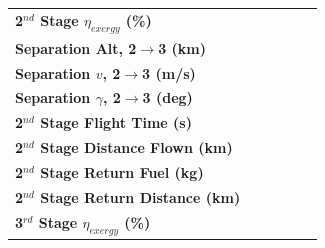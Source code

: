 \begin{table}[ht]
\begin{tabular}{l c c c c c }
		\hline 
		\textbf{2$^{nd}$ Stage $\eta_{exergy}$ (\%)}
		& \textbf{\secondExergyEffheatLimStandard}
		& \textbf{\secondExergyEffheatLimSeventeenHundred}
		& \textbf{\secondExergyEffheatLimSixteenHundred}
		& \textbf{\secondExergyEffheatLimFifteenHundred}
		& \textbf{\secondExergyEffheatLimFourteenHundred}
		\\
		\textbf{Separation Alt, 2$\rightarrow$3 (km)}
		& \secondthirdSeparationAltheatLimStandard
		& \secondthirdSeparationAltheatLimSeventeenHundred
		& \secondthirdSeparationAltheatLimSixteenHundred
		& \secondthirdSeparationAltheatLimFifteenHundred
		& \secondthirdSeparationAltheatLimFourteenHundred
		\\
		\textbf{Separation $v$, 2$\rightarrow$3 (m/s)}
		& \secondthirdSeparationvheatLimStandard
		& \secondthirdSeparationvheatLimSeventeenHundred
		& \secondthirdSeparationvheatLimSixteenHundred
		& \secondthirdSeparationvheatLimFifteenHundred
		& \secondthirdSeparationvheatLimFourteenHundred
		\\
		\textbf{Separation $\gamma$, 2$\rightarrow$3 (deg)}
		& \secondthirdSeparationgammaheatLimStandard
		& \secondthirdSeparationgammaheatLimSeventeenHundred
		& \secondthirdSeparationgammaheatLimSixteenHundred
		& \secondthirdSeparationgammaheatLimFifteenHundred
		& \secondthirdSeparationgammaheatLimFourteenHundred
		\\
		\textbf{2$^{nd}$ Stage Flight Time (s)}
		& \secondFlightTimeheatLimStandard
		& \secondFlightTimeheatLimSeventeenHundred
		& \secondFlightTimeheatLimSixteenHundred
		& \secondFlightTimeheatLimFifteenHundred
		& \secondFlightTimeheatLimFourteenHundred
		\\
		\textbf{2$^{nd}$ Stage Distance Flown (km)}
		& \SecondDistheatLimStandard
		& \SecondDistheatLimSeventeenHundred
		& \SecondDistheatLimSixteenHundred
		& \SecondDistheatLimFifteenHundred
		& \SecondDistheatLimFourteenHundred
		\\
		\textbf{2$^{nd}$ Stage Return Fuel (kg)}
		& \returnFuelheatLimStandard
		& \returnFuelheatLimSeventeenHundred
		& \returnFuelheatLimSixteenHundred
		& \returnFuelheatLimFifteenHundred
		& \returnFuelheatLimFourteenHundred
		\\
		\textbf{2$^{nd}$ Stage Return Distance (km)}
		& \returnDistheatLimStandard
		& \returnDistheatLimSeventeenHundred
		& \returnDistheatLimSixteenHundred
		& \returnDistheatLimFifteenHundred
		& \returnDistheatLimFourteenHundred
		\\
		\hline 
		\textbf{3$^{rd}$ Stage $\eta_{exergy}$ (\%)}
		& \textbf{\thirddExergyEffheatLimStandard}

\end{tabular}
\end{table}
